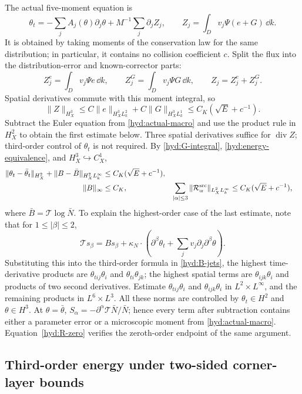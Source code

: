 The actual five-moment equation is
\begin{equation}\label{hyd:actual-macro}
 \theta_t=-\sum_jA_j(\theta)\partial_j\theta
                 +M^{-1}\sum_j\partial_jZ_j,
 \qquad Z_j=\int_Dv_j\Psi(e+G)\,\dd k.
\end{equation}
It is obtained by taking moments of the conservation law for the same
distribution; in particular, it contains no collision coefficient $c$.
Split the flux into the distribution-error and known-corrector parts:
\[
 Z_j^e=\int_Dv_j\Psi e\,\dd k,\qquad
 Z_j^G=\int_Dv_j\Psi G\,\dd k,\qquad Z_j=Z_j^e+Z_j^G.
\]
Spatial derivatives commute with this moment integral, so
\[
 \|Z\|_{H_X^3}\le
 C\|e\|_{H_X^3L_k^2}+C\|G\|_{H_X^3L_k^1}
 \le C_K(\sqrt E+c^{-1}).
\]
Subtract the Euler equation from \eqref{hyd:actual-macro} and use the
product rule in $H^2_X$ to obtain the first estimate below. Three spatial
derivatives suffice for $\operatorname{div}Z$; third-order control of
$\theta_t$ is not required. By \eqref{hyd:G-integral},
\eqref{hyd:energy-equivalence}, and $H^3_X\hookrightarrow C^1_X$,
\begin{align}
 \|\theta_t-\bar\theta_t\|_{H_X^2}
       +\|B-\bar B\|_{H_X^2L_k^\infty}
       &\le C_K(\sqrt E+c^{-1}),\notag\\
 \|B\|_\infty&\le C_K,
 &\sum_{|\alpha|\le3}\|\mathcal R_\alpha^{\mathrm{src}}\|_{L_X^2L_k^\infty}
       &\le C_K(\sqrt E+c^{-1}),
 \label{hyd:connection-bounds}
\end{align}
where $\bar B=\mathcal T\log\bar N$. To explain the highest-order case
of the last estimate, note that for $1\le|\beta|\le2$,
\[
 \mathcal Ts_\beta
 =B s_\beta+\kappa_N\cdot
       \left(\partial^\beta\theta_t+
             \sum_jv_j\partial_j\partial^\beta\theta\right).
\]
Substituting this into the third-order formula in \eqref{hyd:B-jets},
the highest time-derivative products are $\theta_{tij}\theta_i$ and
$\theta_{ti}\theta_{jk}$; the highest spatial terms are
$\theta_{ijk}\theta_i$ and products of two second derivatives.
Estimate $\theta_{tij}\theta_i$ and $\theta_{ijk}\theta_i$ in
$L^2\times L^\infty$, and the remaining products in $L^6\times L^3$.
All these norms are controlled by $\theta_t\in H^2$ and $\theta\in H^3$.
At $\theta=\bar\theta$,
$S_\alpha=-\partial^\alpha\mathcal T\bar N/\bar N$; hence every term
after subtraction contains either a parameter error or a microscopic
moment from \eqref{hyd:actual-macro}. Equation~\eqref{hyd:R-zero}
verifies the zeroth-order endpoint of the same argument.

\subsection{Third-order energy under two-sided corner-layer bounds}
\label{hyd:energy-section}

